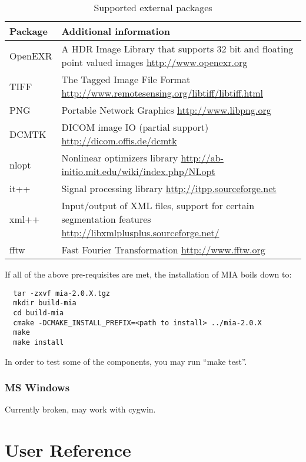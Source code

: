 \documentclass[english, 10pt, a4paper,headsepline,openany]{scrbook}
\begin{document}
\begin{table}[h]
\caption{\label{tab:external}Supported external packages}
\begin{tabularx}{\linewidth}{lX}
\hline 
{\bf Package } & {\bf Additional information} \\
\hline 
\hline 
{ OpenEXR } & A HDR Image Library that supports 32 bit and floating point valued 
                 images \url{http://www.openexr.org} \\
\hline 
{ TIFF } & The Tagged Image File Format \url{http://www.remotesensing.org/libtiff/libtiff.html} \\
\hline 
{ PNG } & Portable Network Graphics \url{http://www.libpng.org} \\
\hline 
{ DCMTK } & DICOM image IO (partial support) \url{http://dicom.offis.de/dcmtk} \\
\hline 
{ nlopt } & Nonlinear optimizers library  \url{http://ab-initio.mit.edu/wiki/index.php/NLopt} \\
\hline 
{ it++ } & Signal processing library \url{http://itpp.sourceforge.net}  \\
\hline 
{ xml++ } & Input/output of XML files, support for certain segmentation features \url{http://libxmlplusplus.sourceforge.net/} \\
\hline 
{ fftw } & Fast Fourier Transformation \url{http://www.fftw.org}  \\
\hline 
\end{tabularx}
\end{table}

If all of the above pre-requisites are met, the installation of MIA boils down to:

\lstset{language=bash}
\begin{lstlisting}
  tar -zxvf mia-2.0.X.tgz
  mkdir build-mia
  cd build-mia
  cmake -DCMAKE_INSTALL_PREFIX=<path to install> ../mia-2.0.X
  make
  make install
\end{lstlisting}
In order to test some of the components, you may run ``make test''. 

\subsection{MS Windows} 

Currently broken, may work with cygwin. 

\chapter{User Reference}
\end{document}
